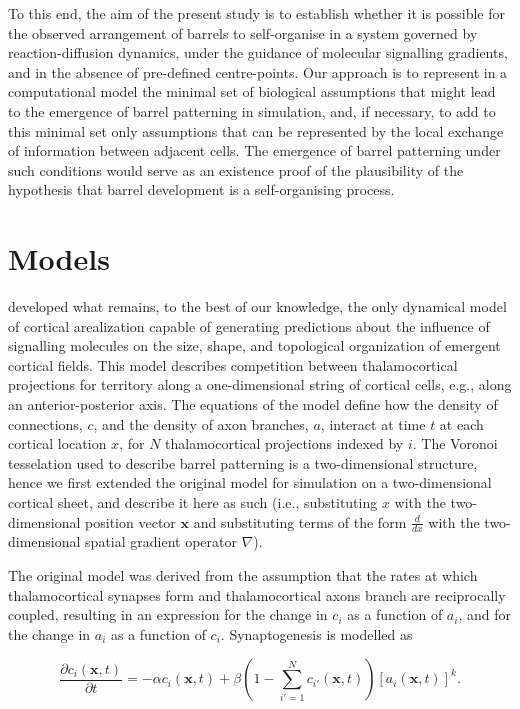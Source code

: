 \documentclass[a4paper,11pt]{article}
\newcommand{\mb}[1]{\mathbf{#1}}
\begin{document}
To this end, the aim of the present study is to establish whether it is
possible for the observed arrangement of barrels to self-organise in a system
governed by reaction-diffusion dynamics, under the guidance of molecular
signalling gradients, and in the absence of pre-defined centre-points. Our
approach is to represent in a computational model the minimal set of
biological assumptions that might lead to the emergence of barrel patterning
in simulation, and, if necessary, to add to this minimal set only assumptions
that can be represented by the local exchange of information between adjacent
cells. The emergence of barrel patterning under such conditions would serve as
an existence proof of the plausibility of the hypothesis that barrel
development is a self-organising process.

\section*{Models}

\cite{Karbowski2004} developed what remains, to the best of our knowledge, the
only dynamical model of cortical arealization capable of generating
predictions about the influence of signalling molecules on the size, shape,
and topological organization of emergent cortical fields. This model describes
competition between thalamocortical projections for territory along a
one-dimensional string of cortical cells, e.g., along an anterior-posterior
axis. The equations of the model define how the density of connections, $c$,
and the density of axon branches, $a$, interact at time $t$ at each cortical
location $x$, for $N$ thalamocortical projections indexed by $i$. The Voronoi
tesselation used to describe barrel patterning is a two-dimensional structure,
hence we first extended the original model for simulation on a two-dimensional
cortical sheet, and describe it here as such (i.e., substituting $x$ with the
two-dimensional position vector $\mb{x}$ and substituting terms of the form
$\frac{d}{dx}$ with the two-dimensional spatial gradient operator $\nabla$).

The original model was derived from the assumption that the rates at which
thalamocortical synapses form and thalamocortical axons branch are
reciprocally coupled, resulting in an expression for the change in $c_i$ as a
function of $a_i$, and for the change in $a_i$ as a function of
$c_i$. Synaptogenesis is modelled as

\begin{equation} \label{eq:dc}
\frac{\partial c_i(\mb{x},t)}{\partial t} =-\alpha c_i(\mb{x},t) +\beta  \left(1 - \sum_{i'=1}^{N} c_{i'}(\mb{x}, t)\right)[a_i(\mb{x},t)]^k.
\end{equation}
\end{document}
